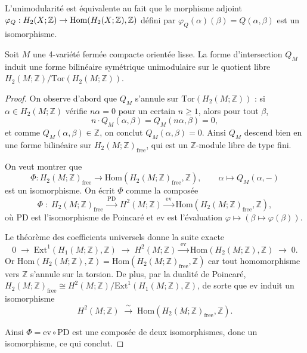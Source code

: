 \begin{remark}
L'unimodularité est équivalente au fait que le morphisme adjoint $\varphi_Q : H_2(X;\mathbb{Z}) \to \mathrm{Hom}(H_2(X;\mathbb{Z}), \mathbb{Z})$ défini par $\varphi_Q(\alpha)(\beta) = Q(\alpha,\beta)$ est un isomorphisme.
\end{remark}

\begin{theorem}[Unimodularité de $Q_M$]
\label{thm:unimod}
Soit $M$ une 4-variété fermée compacte orientée lisse. La forme d'intersection $Q_M$ induit une forme bilinéaire symétrique unimodulaire sur le quotient libre $H_2(M;\mathbb{Z}) / \mathrm{Tor}(H_2(M;\mathbb{Z}))$.
\end{theorem}

\begin{proof}
On observe d'abord que $Q_M$ s'annule sur $\mathrm{Tor}(H_2(M;\mathbb{Z}))$ : si $\alpha \in H_2(M;\mathbb{Z})$ vérifie $n\alpha = 0$ pour un certain $n \geq 1$, alors pour tout $\beta$,
\[
  n \cdot Q_M(\alpha, \beta) = Q_M(n\alpha, \beta) = 0,
\]
et comme $Q_M(\alpha,\beta) \in \mathbb{Z}$, on conclut $Q_M(\alpha,\beta) = 0$. Ainsi $Q_M$ descend bien en une forme bilinéaire sur $H_2(M;\mathbb{Z})_{\mathrm{free}}$, qui est un $\mathbb{Z}$-module libre de type fini.

\medskip

\noindent On veut montrer que
\[
  \Phi : H_2(M;\mathbb{Z})_{\mathrm{free}} \longrightarrow \mathrm{Hom}(H_2(M;\mathbb{Z})_{\mathrm{free}},\mathbb{Z}),
  \qquad \alpha \longmapsto Q_M(\alpha,-)
\]
est un isomorphisme. On écrit $\Phi$ comme la composée
\[
  \Phi \;:\; H_2(M;\mathbb{Z})_{\mathrm{free}}
  \xrightarrow{\;\mathrm{PD}\;}
  H^2(M;\mathbb{Z})
  \xrightarrow{\;\mathrm{ev}\;}
  \mathrm{Hom}(H_2(M;\mathbb{Z})_{\mathrm{free}},\mathbb{Z}),
\]
où $\mathrm{PD}$ est l'isomorphisme de Poincaré et $\mathrm{ev}$ est l'évaluation $\varphi \mapsto (\beta \mapsto \varphi(\beta))$.

\medskip

\noindent Le théorème des coefficients universels donne la suite exacte
\[
  0 \;\longrightarrow\;
  \mathrm{Ext}^1(H_1(M;\mathbb{Z}),\mathbb{Z})
  \;\longrightarrow\;
  H^2(M;\mathbb{Z})
  \xrightarrow{\;\mathrm{ev}\;}
  \mathrm{Hom}(H_2(M;\mathbb{Z}),\mathbb{Z})
  \;\longrightarrow\; 0.
\]
Or $\mathrm{Hom}(H_2(M;\mathbb{Z}), \mathbb{Z}) = \mathrm{Hom}(H_2(M;\mathbb{Z})_{\mathrm{free}}, \mathbb{Z})$ car tout homomorphisme vers $\mathbb{Z}$ s'annule sur la torsion. De plus, par la dualité de Poincaré, $H_2(M;\mathbb{Z})_{\mathrm{free}} \cong H^2(M;\mathbb{Z}) / \mathrm{Ext}^1(H_1(M;\mathbb{Z}), \mathbb{Z})$, de sorte que $\mathrm{ev}$ induit un isomorphisme
\[
H^2(M;\mathbb{Z}) \;\xrightarrow{\;\sim\;}\; \mathrm{Hom}(H_2(M;\mathbb{Z})_{\mathrm{free}}, \mathbb{Z}).
\]

\medskip

\noindent Ainsi $\Phi = \mathrm{ev} \circ \mathrm{PD}$ est une composée de deux isomorphismes, donc un isomorphisme, ce qui conclut.
\end{proof}

